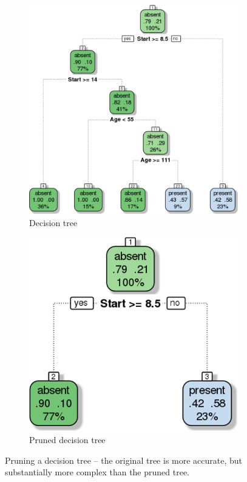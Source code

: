 \begin{figure}[H]
\centering
\begin{subfigure}[m]{0.45\textwidth}
\includegraphics[width=0.25\textheight]{images/DSML/kyphosistree.png}
\caption{\small Decision tree}\label{fig:class8a}
\end{subfigure}
\begin{subfigure}[m]{0.45\textwidth}
\includegraphics[width=0.25\textheight]{images/DSML/prunedkyphosistree.png}
\caption{\small Pruned decision tree}\label{fig:class8b}
\end{subfigure}
\caption[\small Pruning a decision tree]{\small Pruning a decision tree -- the original tree is more accurate, but substantially more complex than the pruned tree.}\label{fig:class8}
\end{figure}
